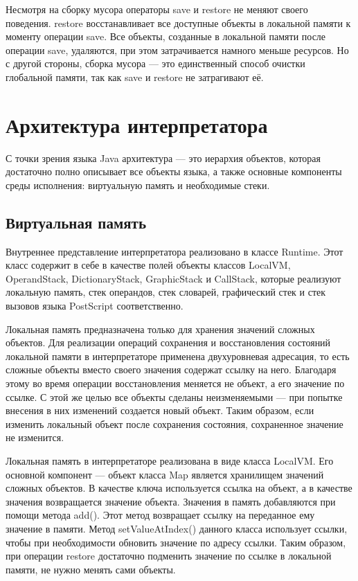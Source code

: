 Несмотря на сборку мусора операторы save и restore не меняют своего поведения. restore восстанавливает все доступные объекты в локальной памяти к моменту операции save. Все объекты, созданные в локальной памяти после операции save, удаляются, при этом затрачивается намного меньше ресурсов. Но с другой стороны, сборка мусора --- это единственный способ очистки глобальной памяти, так как save и restore не затрагивают её.


\section{Архитектура интерпретатора}
С точки зрения языка Java архитектура --- это иерархия объектов, которая достаточно полно описывает все объекты языка, а также основные компоненты среды исполнения: виртуальную память и необходимые стеки. 

\subsection{Виртуальная память}
Внутреннее представление интерпретатора реализовано в классе Runtime. Этот класс содержит в себе в качестве полей объекты классов LocalVM, OperandStack, DictionaryStack, GraphicStack и CallStack, которые реализуют локальную память, стек операндов, стек словарей, графический стек и стек вызовов языка PostScript соответственно.

Локальная память предназначена только для хранения значений сложных объектов. Для реализации операций сохранения и восстановления состояний локальной памяти в интерпретаторе применена двухуровневая адресация, то есть сложные объекты вместо своего значения содержат ссылку на него. Благодаря этому во время операции восстановления меняется не объект, а его значение по ссылке. С этой же целью все объекты сделаны неизменяемыми --- при попытке внесения в них изменений создается новый объект. Таким образом, если изменить локальный объект после сохранения состояния, сохраненное значение не изменится.

Локальная память в интерпретаторе реализована в виде класса LocalVM. Его основной компонент --- объект класса Map является хранилищем значений сложных объектов. В качестве ключа используется ссылка на объект, а в качестве значения возвращается значение объекта. Значения в память добавляются при помощи метода add(). Этот метод возвращает ссылку на переданное ему значение в памяти. Метод setValueAtIndex() данного класса использует ссылки, чтобы при необходимости обновить значение по адресу ссылки. Таким образом, при операции restore достаточно подменить значение по ссылке в локальной памяти, не нужно менять сами объекты.


